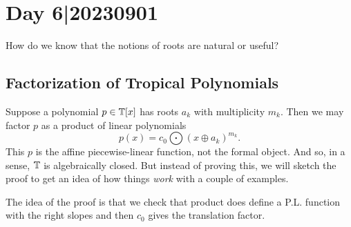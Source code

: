 \documentclass[12pt]{memoir}
\begin{document}
\section{Day 6|20230901}

How do we know that the notions of roots are natural or useful?

\subsection{Factorization of Tropical Polynomials}

Suppose a polynomial $p\in\mathbb{T}[x]$ has roots $a_k$ with multiplicity $m_k$. Then we may factor $p$ as a product of linear polynomials 
$$p(x)=c_0\bigodot(x\oplus a_k)^{m_k}.$$
This $p$ is the affine piecewise-linear function, not the formal object. And so, in a sense, $\mathbb{T}$ is algebraically closed. But instead of proving this, we will sketch the proof to get an idea of how things \emph{work} with a couple of examples.\par 
The idea of the proof is that we check that product does define a P.L. function with the right slopes and then $c_0$ gives the translation factor.
\end{document}
